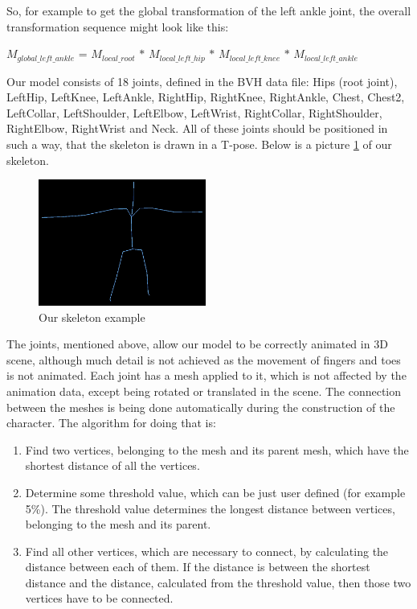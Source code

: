 \documentclass[times, 10pt,twocolumn]{article}
\begin{document}
So, for example to get the global transformation of the left ankle joint, the overall transformation sequence might look like this:

\begin{center}
$M_{global\_left\_ankle}$ = $M_{local\_root}$ $\ast$ $M_{local\_left\_hip}$ $\ast$ $M_{local\_left\_knee}$ $\ast$ $M_{local\_left\_ankle}$
\end{center}


\label{preparing_character}

Our model consists of 18 joints, defined in the BVH data file: Hips (root joint), LeftHip, LeftKnee, LeftAnkle, RightHip, RightKnee, RightAnkle, Chest, Chest2, LeftCollar, LeftShoulder, LeftElbow, LeftWrist, RightCollar, RightShoulder, RightElbow, RightWrist and Neck. All of these joints should be positioned in such a way, that the skeleton is drawn in a T-pose. Below is a picture \ref{our_skeleton} of our skeleton.

\begin{figure}[H]
  \caption{Our skeleton example}
  \label{our_skeleton}
  \centering
  \includegraphics[width=55mm]{images/our_skeleton.jpg}
\end{figure}

The joints, mentioned above, allow our model to be correctly animated in 3D scene, although much detail is not achieved as the movement of fingers and toes is not animated. Each joint has a mesh applied to it, which is not affected by the animation data, except being rotated or translated in the scene. The connection between the meshes is being done automatically during the construction of the character. The algorithm for doing that is:

\begin{enumerate}
\item Find two vertices, belonging to the mesh and its parent mesh, which have the shortest distance of all the vertices.
\item Determine some threshold value, which can be just user defined (for example 5\%). The threshold value determines the longest distance between vertices, belonging to the mesh and its parent.
\item Find all other vertices, which are necessary to connect, by calculating the distance between each of them. If the distance is between the shortest distance and the distance, calculated from the threshold value, then those two vertices have to be connected.
\end{enumerate}
\end{document}
